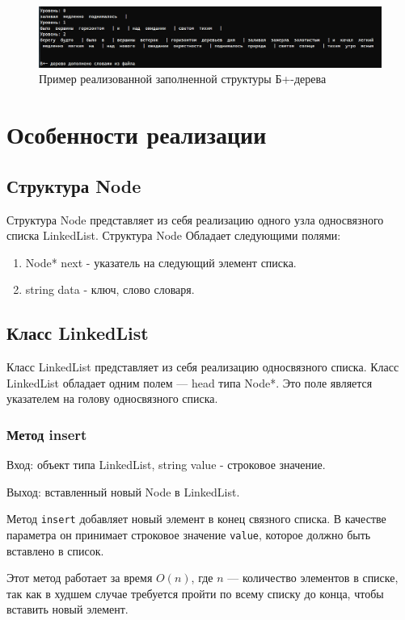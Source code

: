 \documentclass[11pt,a4paper,final]{article} %
\begin{document}
\begin{figure}[H]
	\centering
	\includegraphics[width=1.1\linewidth]{img/tr.png}
	\caption{Пример реализованной заполненной структуры Б+-дерева}
	\label{fig:tr}
\end{figure}




\newpage
\section{Особенности реализации}
\subsection{Структура Node}
Структура Node представляет из себя реализацию одного узла односвязного списка LinkedList. Структура Node Обладает следующими полями:
\begin{enumerate}
	\item Node* next - указатель на следующий элемент списка.
	\item string data - ключ, слово словаря.
\end{enumerate}

\subsection{Класс LinkedList}
Класс LinkedList представляет из себя реализацию односвязного списка. Класс LinkedList обладает одним полем --- head типа Node*. Это поле является указателем на голову односвязного списка.
  
\subsubsection{Метод insert}
Вход: объект типа LinkedList, string value - строковое значение. \par
Выход: вставленный новый Node в LinkedList. \par

\par Метод \texttt{insert} добавляет новый элемент в конец связного списка. В качестве параметра он принимает строковое значение \texttt{value}, которое должно быть вставлено в список.

\par Этот метод работает за время $O(n)$, где $n$ — количество элементов в списке, так как в худшем случае требуется пройти по всему списку до конца, чтобы вставить новый элемент.
\end{document}
